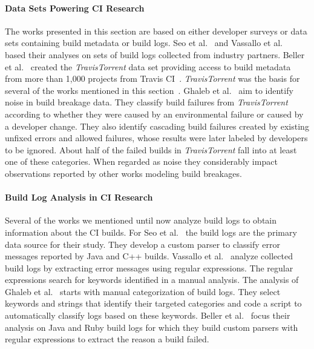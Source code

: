\documentclass[\myrootdir/main.tex]{subfiles}
\begin{document}
\paragraph{Data Sets Powering CI Research}
The works presented in this section are based on either developer surveys or data sets containing build metadata or build logs.
Seo et al.~\cite{seo2014programmers} and Vassallo et al.~\cite{vassallo2017a-tale} based their analyses on sets of build logs collected from industry partners.
Beller et al.~\cite{beller2017travistorrent} created the \emph{TravisTorrent} data set providing access to build metadata from more than 1,000 projects from Travis CI~\cite{travisci2019webpage}.
\emph{TravisTorrent} was the basis for several of the works mentioned in this section~\cite{rausch2017empirical,zampetti2017open,vassallo2017a-tale,beller2017oops}.
Ghaleb et al.~\cite{ghaleb2019studying} aim to identify noise in build breakage data.
They classify build failures from \emph{TravisTorrent} according to whether they were caused by an environmental failure or caused by a developer change.
They also identify cascading build failures created by existing unfixed errors and allowed failures, whose results were later labeled by developers to be ignored.
About half of the failed builds in \emph{TravisTorrent} fall into at least one of these categories.
When regarded as noise they considerably impact observations reported by other works modeling build breakages.

\paragraph{Build Log Analysis in CI Research}
Several of the works we mentioned until now analyze build logs to obtain information about the CI builds. 
For Seo et al.~\cite{seo2014programmers} the build logs are the primary data source for their study.
They develop a custom parser to classify error messages reported by Java and C++ builds. 
Vassallo et al.~\cite{vassallo2017a-tale} analyze collected build logs by extracting error messages using regular expressions.
The regular expressions search for keywords identified in a manual analysis.
The analysis of Ghaleb et al.~\cite{ghaleb2019studying} starts with manual categorization of build logs.
They select keywords and strings that identify their targeted categories and code a script to automatically classify logs based on these keywords.
Beller et al.~\cite{beller2017oops} focus their analysis on Java and Ruby build logs for which they build custom parsers with regular expressions to extract the reason a build failed.
\end{document}

